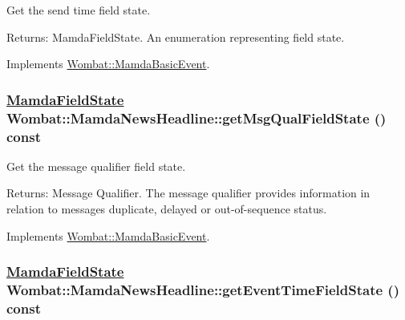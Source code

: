 Get the send time field state. 

\begin{Desc}
\item[Returns:]Mamda\-Field\-State. An enumeration representing field state. \end{Desc}


Implements \hyperlink{classWombat_1_1MamdaBasicEvent_418ecb29b412cd42581b54c87b5360fd}{Wombat::Mamda\-Basic\-Event}.\hypertarget{classWombat_1_1MamdaNewsHeadline_dccb147f13eb839ad4c8e69afe20c3be}{
\subsubsection[getMsgQualFieldState]{\setlength{\rightskip}{0pt plus 5cm}\hyperlink{namespaceWombat_93aac974f2ab713554fd12a1fa3b7d2a}{Mamda\-Field\-State} Wombat::Mamda\-News\-Headline::get\-Msg\-Qual\-Field\-State () const}}
\label{classWombat_1_1MamdaNewsHeadline_dccb147f13eb839ad4c8e69afe20c3be}


Get the message qualifier field state. 

\begin{Desc}
\item[Returns:]Message Qualifier. The message qualifier provides information in relation to messages duplicate, delayed or out-of-sequence status. \end{Desc}


Implements \hyperlink{classWombat_1_1MamdaBasicEvent_3454d51e1131d9949691ee4b4153cd97}{Wombat::Mamda\-Basic\-Event}.\hypertarget{classWombat_1_1MamdaNewsHeadline_bf7d4aed46483085ed6a4eac39d2f142}{
\subsubsection[getEventTimeFieldState]{\setlength{\rightskip}{0pt plus 5cm}\hyperlink{namespaceWombat_93aac974f2ab713554fd12a1fa3b7d2a}{Mamda\-Field\-State} Wombat::Mamda\-News\-Headline::get\-Event\-Time\-Field\-State () const}}
\label{classWombat_1_1MamdaNewsHeadline_bf7d4aed46483085ed6a4eac39d2f142}


